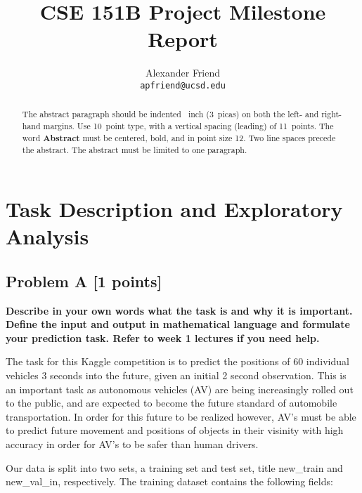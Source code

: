 \documentclass{article}
\title{CSE 151B Project Milestone Report}
\author{%
    Alexander Friend\\
    \texttt{apfriend@ucsd.edu}
}
\begin{document}
\maketitle

\begin{abstract}
    The abstract paragraph should be indented ~inch (3~picas) on
    both the left- and right-hand margins. Use 10~point type, with a vertical
    spacing (leading) of 11~points.  The word \textbf{Abstract} must be centered,
    bold, and in point size 12. Two line spaces precede the abstract. The abstract
    must be limited to one paragraph.
\end{abstract}

\section{Task Description and Exploratory Analysis}
    \subsection{Problem A [1 points]}        
        \textbf{
            Describe in your own words what the task is and why it is
            important. Define the input and output in mathematical language and formulate your
            prediction task. Refer to week 1 lectures if you need help.
        }
        
        The task for this Kaggle competition is to predict the positions of 60 individual 
        vehicles 3 seconds into the future, given an initial 2 second observation. This is 
        an important task as autonomous vehicles (AV) are being increasingly rolled out to the public,
        and are expected to become the future standard of automobile transportation. In order 
        for this future to be realized however, AV's must be able to predict future movement and positions
        of objects in their visinity with high accuracy in order for AV's to be safer than human drivers.

        Our data is split into two sets, a training set and test set, title {\selectfont new\_train} and 
        {\selectfont new\_val\_in}, respectively. The training dataset contains the following fields: 
        
\end{document}

